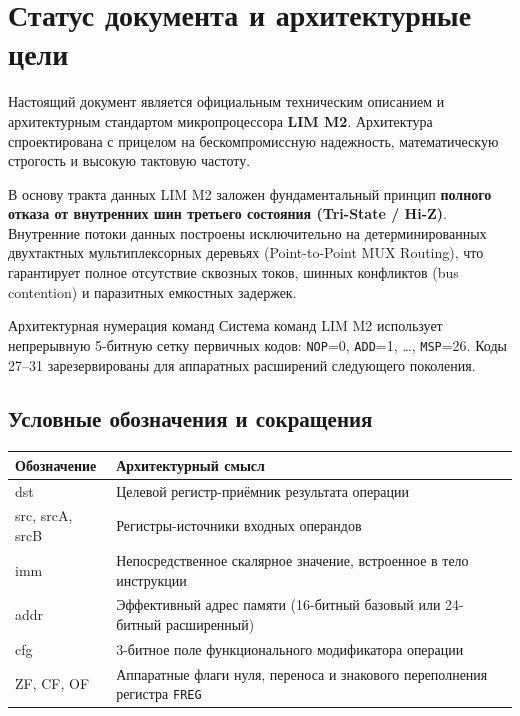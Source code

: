 \documentclass[11pt,a4paper]{article}
\newcommand{\reg}[1]{\texttt{#1}}
\begin{document}
\tableofcontents
\clearpage

\section{Статус документа и архитектурные цели}
Настоящий документ является официальным техническим описанием и архитектурным стандартом микропроцессора \textbf{LIM M2}. 
Архитектура спроектирована с прицелом на бескомпромиссную надежность, математическую строгость и высокую тактовую частоту.

В основу тракта данных LIM M2 заложен фундаментальный принцип \textbf{полного отказа от внутренних шин третьего состояния (Tri-State / Hi-Z)}. Внутренние потоки данных построены исключительно на детерминированных двухтактных мультиплексорных деревьях (Point-to-Point MUX Routing), что гарантирует полное отсутствие сквозных токов, шинных конфликтов (bus contention) и паразитных емкостных задержек.

\begin{limnote}{Архитектурная нумерация команд}
Система команд LIM M2 использует непрерывную 5-битную сетку первичных кодов: 
\texttt{NOP}=0, \texttt{ADD}=1, \ldots, \texttt{MSP}=26. Коды 27--31 зарезервированы для аппаратных расширений следующего поколения.
\end{limnote}

\subsection{Условные обозначения и сокращения}
\begin{tabularx}{\textwidth}{>{\ttfamily}p{28mm}X}
\toprule
Обозначение & Архитектурный смысл \\
\midrule
dst & Целевой регистр-приёмник результата операции \\
src, srcA, srcB & Регистры-источники входных операндов \\
imm & Непосредственное скалярное значение, встроенное в тело инструкции \\
addr & Эффективный адрес памяти (16-битный базовый или 24-битный расширенный) \\
cfg & 3-битное поле функционального модификатора операции \\
ZF, CF, OF & Аппаратные флаги нуля, переноса и знакового переполнения регистра \reg{FREG} \\
\bottomrule
\end{tabularx}
\end{document}
